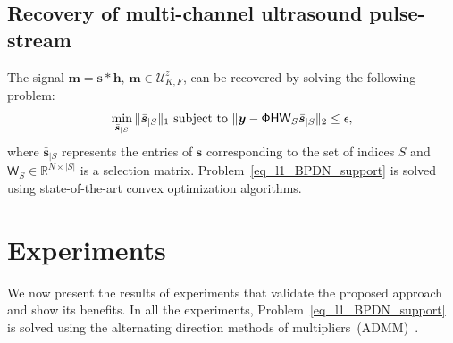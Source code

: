 \documentclass[journal]{IEEEtran}
\newcommand{\vect}[1]{\bm{#1}}
\newcommand{\mat}[1]{\mathsf{#1}}
\theoremstyle{definition}
\begin{document}
\subsection{Recovery of multi-channel ultrasound pulse-stream}
\label{subsec_sampling_pulse_stream}
The signal $\vect{m} = \vect{s} \ast \vect{h}$, $\vect{m} \in \mathcal{U}^z_{K,F}$, can be recovered by solving the following problem:
\begin{equation}
\label{eq_l1_BPDN_support}
\min_{\bar{\vect{s}}_{|S}}\|\bar{\vect{s}}_{|S}\|_{1}
\textnormal{ subject to }\| \bm{y}-\mat{\Phi H W}_S\bar{\vect{s}}_{|S}\|_{2}\leq\epsilon,
\end{equation}
where $\bar{\vect{s}}_{|S}$ represents the entries of $\vect{s}$ corresponding to the set of indices $S$ and $\mat{W}_S \in \mathbb{R}^{N \times |S|}$ is a selection matrix. 
Problem~\eqref{eq_l1_BPDN_support} is solved using state-of-the-art convex optimization algorithms.
\section{Experiments}
\label{sec_exp}
We now present the results of experiments that validate the proposed approach and show its benefits.
In all the experiments, Problem~\eqref{eq_l1_BPDN_support} is solved using the alternating direction methods of multipliers~(ADMM)~\cite{Boyd2010}.
\end{document}
